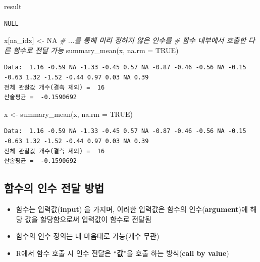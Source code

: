 \documentclass[
  11pt,
]{krantz}
\newenvironment{Shaded}{\begin{snugshade}}{\end{snugshade}}
\newcommand{\AttributeTok}[1]{\textcolor[rgb]{0.61,0.61,0.61}{#1}}
\newcommand{\CommentTok}[1]{\textcolor[rgb]{0.37,0.37,0.37}{\textit{#1}}}
\newcommand{\ConstantTok}[1]{\textcolor[rgb]{0,0,0}{#1}}
\newcommand{\FunctionTok}[1]{\textcolor[rgb]{0,0,0}{#1}}
\newcommand{\NormalTok}[1]{#1}
\newcommand{\OtherTok}[1]{\textcolor[rgb]{0.37,0.37,0.37}{#1}}
\providecommand{\tightlist}{%
  \setlength{\itemsep}{0pt}\setlength{\parskip}{0pt}}
\begin{document}
\begin{Shaded}
\begin{Highlighting}[]
\NormalTok{result }
\end{Highlighting}
\end{Shaded}

\begin{verbatim}
NULL
\end{verbatim}

\begin{Shaded}
\begin{Highlighting}[]
\NormalTok{x[na\_idx] }\OtherTok{\textless{}{-}} \ConstantTok{NA}
\CommentTok{\# ...를 통해 미리 정하지 않은 인수를 }
\CommentTok{\# 함수 내부에서 호출한 다른 함수로 전달 가능}
\FunctionTok{summary\_mean}\NormalTok{(x, }\AttributeTok{na.rm =} \ConstantTok{TRUE}\NormalTok{) }
\end{Highlighting}
\end{Shaded}

\begin{verbatim}
Data:  1.16 -0.59 NA -1.33 -0.45 0.57 NA -0.87 -0.46 -0.56 NA -0.15 -0.63 1.32 -1.52 -0.44 0.97 0.03 NA 0.39 
전체 관찰값 개수(결측 제외) =  16 
산술평균 =  -0.1590692 
\end{verbatim}

\begin{Shaded}
\begin{Highlighting}[]
\NormalTok{x }\OtherTok{\textless{}{-}} \FunctionTok{summary\_mean}\NormalTok{(x, }\AttributeTok{na.rm =} \ConstantTok{TRUE}\NormalTok{)}
\end{Highlighting}
\end{Shaded}

\begin{verbatim}
Data:  1.16 -0.59 NA -1.33 -0.45 0.57 NA -0.87 -0.46 -0.56 NA -0.15 -0.63 1.32 -1.52 -0.44 0.97 0.03 NA 0.39 
전체 관찰값 개수(결측 제외) =  16 
산술평균 =  -0.1590692 
\end{verbatim}

\normalsize

\hypertarget{uxd568uxc218uxc758-uxc778uxc218-uxc804uxb2ec-uxbc29uxbc95}{%
\subsection{함수의 인수 전달 방법}\label{uxd568uxc218uxc758-uxc778uxc218-uxc804uxb2ec-uxbc29uxbc95}}

\begin{itemize}
\tightlist
\item
  함수는 입력값(\textbf{input}) 을 가지며, 이러한 입력값은 함수의 인수(\textbf{argument})에 해당 값을 할당함으로써 입력값이 함수로 전달됨
\item
  함수의 인수 정의는 내 마음대로 가능(개수 무관)
\item
  R에서 함수 호출 시 인수 전달은 ``\textbf{값}''을 호출 하는 방식(\textbf{call by value})
\end{itemize}
\end{document}
